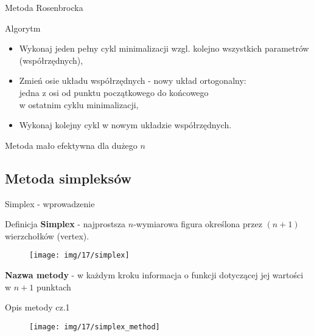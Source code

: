   \begin{frame}{Metoda Rosenbrocka}

    \begin{block}{Algorytm}
 	  \begin{itemize}
   		\item Wykonaj jeden pełny cykl minimalizacji wzgl. kolejno wszystkich parametrów (współrzędnych),
   		\item Zmień osie układu współrzędnych - nowy układ ortogonalny:
   		\\jedna z osi od punktu początkowego do końcowego
   		\\w ostatnim cyklu minimalizacji,
   		\item Wykonaj kolejny cykl w nowym układzie współrzędnych.
  	\end{itemize}
  	\end{block}
  	  Metoda mało efektywna dla dużego $n$

  \end{frame}

\subsection{Metoda simpleksów}

  \begin{frame}{Simplex - wprowadzenie}

    \begin{block}{Definicja}
 	  \textbf{Simplex} - najprostsza $n$-wymiarowa figura określona przez $(n+1)$ wierzchołków (vertex).
  	\end{block}
  	\begin{figure}
		\centering
		\texttt{[image: img/17/simplex]}
	\end{figure}
  	\begin{block}{}
 	  \textbf{Nazwa metody} - w każdym kroku informacja o funkcji dotyczącej jej wartości w $n+1$ punktach
  	\end{block}

  \end{frame}

  \begin{frame}{Opis metody cz.1}

  	\begin{figure}
		\centering
		\texttt{[image: img/17/simplex\_method]}
	\end{figure}

  \end{frame}

